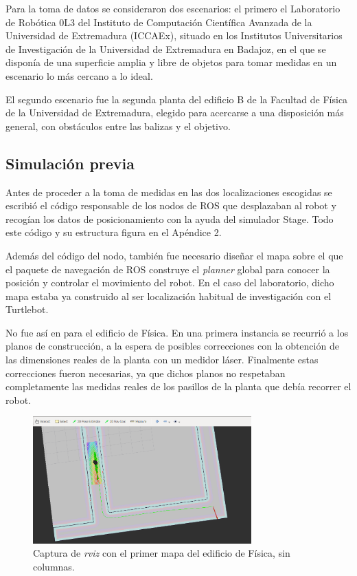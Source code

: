 Para la toma de datos se consideraron dos escenarios: el primero el Laboratorio de Robótica 0L3 del Instituto de Computación Científica Avanzada de la Universidad de Extremadura (ICCAEx), situado en los Institutos Universitarios de Investigación de la Universidad de Extremadura en Badajoz, en el que se disponía de una superficie amplia y libre de objetos para tomar medidas en un escenario lo más cercano a lo ideal.

El segundo escenario fue la segunda planta del edificio B de la Facultad de Física de la Universidad de Extremadura, elegido para acercarse a una disposición más general, con obstáculos entre las balizas y el objetivo.

\subsection{Simulación previa}

Antes de proceder a la toma de medidas en las dos localizaciones escogidas se escribió el código responsable de los nodos de ROS que desplazaban al robot y recogían los datos de posicionamiento con la ayuda del simulador Stage.
Todo este código y su estructura figura en el Apéndice 2.

Además del código del nodo, también fue necesario diseñar el mapa sobre el que el paquete de navegación de ROS construye el \textit{planner} global para conocer la posición y controlar el movimiento del robot.
En el caso del laboratorio, dicho mapa estaba ya construido al ser localización habitual de investigación con el Turtlebot.

No fue así en para el edificio de Física.
En una primera instancia se recurrió a los planos de construcción, a la espera de posibles correcciones con la obtención de las dimensiones reales de la planta con un medidor láser.
Finalmente estas correcciones fueron necesarias, ya que dichos planos no respetaban completamente las medidas reales de los pasillos de la planta que debía recorrer el robot.

\begin{figure}[H]
  \centering
  \includegraphics[width=0.75\textwidth]{pic/Trayectoria.png}
  \caption{Captura de \textit{rviz} con el primer mapa del edificio de Física, sin columnas.}
  \label{fig:plano_fisica}
\end{figure}

